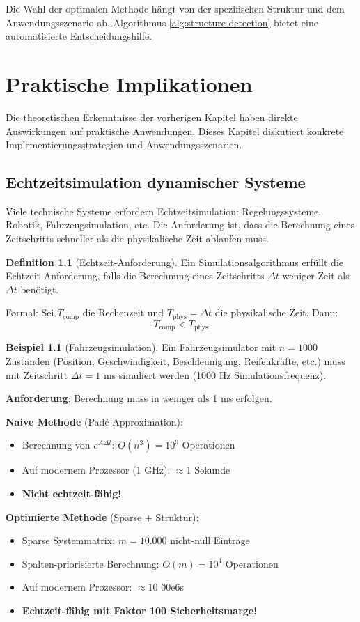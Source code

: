 ﻿\documentclass[a4paper,12pt]{report}
\theoremstyle{definition}
\newtheorem{definition}{Definition}
\newtheorem{beispiel}{Beispiel}
\begin{document}
	Die Wahl der optimalen Methode hängt von der spezifischen Struktur und dem Anwendungsszenario ab. Algorithmus \ref{alg:structure-detection} bietet eine automatisierte Entscheidungshilfe.
	
	\chapter{Praktische Implikationen}
	
	Die theoretischen Erkenntnisse der vorherigen Kapitel haben direkte Auswirkungen auf praktische Anwendungen. Dieses Kapitel diskutiert konkrete Implementierungsstrategien und Anwendungsszenarien.
	
	\section{Echtzeitsimulation dynamischer Systeme}
	
	Viele technische Systeme erfordern Echtzeitsimulation: Regelungssysteme, Robotik, Fahrzeugsimulation, etc. Die Anforderung ist, dass die Berechnung eines Zeitschritts schneller als die physikalische Zeit ablaufen muss.
	
	\begin{definition}[Echtzeit-Anforderung]
		Ein Simulationsalgorithmus erfüllt die Echtzeit-Anforderung, falls die Berechnung eines Zeitschritts $\Delta t$ weniger Zeit als $\Delta t$ benötigt.
		
		Formal: Sei $T_{\text{comp}}$ die Rechenzeit und $T_{\text{phys}} = \Delta t$ die physikalische Zeit. Dann:
		\[
		T_{\text{comp}} < T_{\text{phys}}
		\]
	\end{definition}
	
	\begin{beispiel}[Fahrzeugsimulation]
		Ein Fahrzeugsimulator mit $n = 1000$ Zuständen (Position, Geschwindigkeit, Beschleunigung, Reifenkräfte, etc.) muss mit Zeitschritt $\Delta t = 1$ ms simuliert werden (1000 Hz Simulationsfrequenz).
		
		\textbf{Anforderung}: Berechnung muss in weniger als 1 ms erfolgen.
		
		\textbf{Naive Methode} (Padé-Approximation):
		\begin{itemize}
			\item Berechnung von $e^{A \Delta t}$: $O(n^3) = 10^9$ Operationen
			\item Auf modernem Prozessor (1 GHz): $\approx 1$ Sekunde
			\item \textbf{Nicht echtzeit-fähig!}
		\end{itemize}
		
		\textbf{Optimierte Methode} (Sparse + Struktur):
		\begin{itemize}
			\item Sparse Systemmatrix: $m = 10.000$ nicht-null Einträge
			\item Spalten-priorisierte Berechnung: $O(m) = 10^4$ Operationen
			\item Auf modernem Prozessor: $\approx 10$ \u00e6s
			\item \textbf{Echtzeit-fähig mit Faktor 100 Sicherheitsmarge!}
		\end{itemize}
	\end{beispiel}
	
\end{document}
